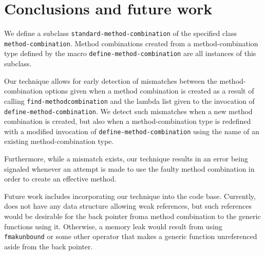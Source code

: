 \section{Conclusions and future work}
\label{sec-conclusions}

We define a subclass \texttt{standard-method-combination} of the
specified class \texttt{method-combination}.  Method combinations
created from a method-combination type defined by the macro
\texttt{define-method-combination} are all instances of this subclass.

Our technique allows for early detection of mismatches between the
method-combination options given when a method combination is created
as a result of calling \texttt{find-method\-combination} and the lambda
list given to the invocation of \texttt{define-method-combination}.
We detect such mismatches when a new method combination is created,
but also when a method-combination type is redefined with a modified
invocation of \texttt{define-method-combination} using the name
of an existing method-combination type.

Furthermore, while a mismatch exists, our technique results in an
error being signaled whenever an attempt is made to use the faulty
method combination in order to create an effective method.

Future work includes incorporating our technique into the \sicl{} code
base.  Currently, \sicl{} does not have any data structure allowing
weak references, but such references would be desirable for the back
pointer froma method combination to the generic functions using it.
Otherwise, a memory leak would result from using \texttt{fmakunbound}
or some other operator that makes a generic function unreferenced
aside from the back pointer.
